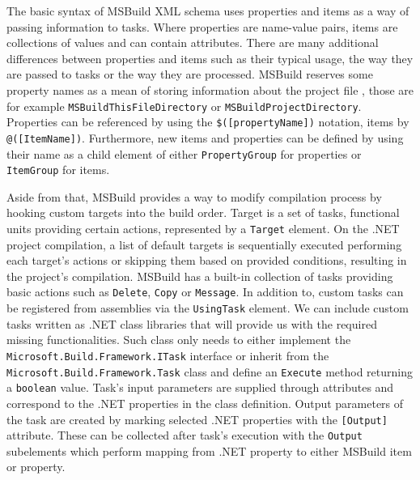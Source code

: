 The basic syntax of MSBuild XML schema uses properties and items as a way of passing information to tasks. Where properties are name-value pairs, items are collections of values and can contain attributes. There are many additional differences between properties and items such as their typical usage, the way they are passed to tasks or the way they are processed. MSBuild reserves some property names as a mean of storing information about the project file \citep{microsoft.docs}, those are for example \texttt{MSBuildThisFileDirectory} or \texttt{MSBuildProjectDirectory}. Properties can be referenced by using the \texttt{\$([propertyName])} notation, items by \texttt{@([ItemName])}. Furthermore, new items and properties can be defined by using their name as a child element of either \texttt{PropertyGroup} for properties or \texttt{ItemGroup} for items.

Aside from that, MSBuild provides a way to modify compilation process by hooking custom targets into the build order. Target is a set of tasks, functional units providing certain actions, represented by a \texttt{Target} element. On the .NET project compilation, a list of default targets is sequentially executed performing each target's actions or skipping them based on provided conditions, resulting in the project's compilation. MSBuild has a built-in collection of tasks providing basic actions such as \texttt{Delete}, \texttt{Copy} or \texttt{Message}. In addition to, custom tasks can be registered from assemblies via the \texttt{UsingTask} element. We can include custom tasks written as .NET class libraries that will provide us with the required missing functionalities. Such class only needs to either implement the \texttt{Microsoft.Build.Framework.ITask} interface or inherit from the \texttt{Microsoft.Build.Framework.Task} class and define an \texttt{Execute} method returning a \texttt{boolean} value. Task's input parameters are supplied through attributes and correspond to the .NET properties in the class definition. Output parameters of the task are created by marking selected .NET properties with the \texttt{[Output]} attribute. These can be collected after task's execution with the \texttt{Output} subelements which perform mapping from .NET property to either MSBuild item or property.


